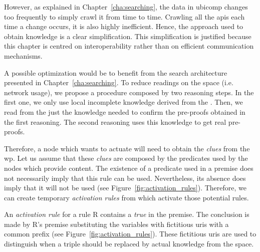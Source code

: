 However, as explained in Chapter~\ref{cha:searching}, the data in \ac{ubicomp} changes too frequently to simply crawl it from time to time.
Crawling all the \acsp{api} each time a change occurs, it is also highly inefficient.
Hence, the approach used to obtain knowledge is a clear simplification.
This simplification is justified because this chapter is centred on interoperability rather than on efficient communication mechanisms.


\bigskip


A possible optimization would be to benefit from the search architecture presented in Chapter~\ref{cha:searching}.
To reduce readings on the space (i.e. network usage), we propose a procedure composed by two reasoning steps.
In the first one, we only use local incomplete knowledge derived from the \clues{}.
Then, we read from the \Space{} just the knowledge needed to confirm the pre-proofs obtained in the first reasoning.
The second reasoning uses this knowledge to get real pre-proofs. %


Therefore, a node which wants to actuate will need to obtain the \emph{clues} from the \ac{wp}.
Let us assume that these \emph{clues} are composed by the predicates used by the nodes which provide content. %
The existence of a predicate used in a premise does not necessarily imply that this rule can be used.
Nevertheless, its absence does imply that it will not be used (see Figure~\ref{fig:activation_rules}).
Therefore, we can create temporary \emph{activation rules} from \clues{} which activate those potential rules. %




An \emph{activation rule} for a rule R contains a \emph{true} in the premise.
The conclusion is made by R's premise substituting the variables with fictitious \acsp{uri} with a common prefix (see Figure~\ref{fig:activation_rules}).
These fictitious \acsp{uri} are used to distinguish when a triple should be replaced by actual knowledge from the space. %



